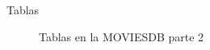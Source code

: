 \documentclass{beamer}%
\begin{document}
\begin{frame}{Tablas}
\begin{figure}
\begin{subfigure}[b]{0.3\textwidth}
    \end{subfigure}
    \caption{Tablas en la MOVIESDB parte 2}
\end{figure}
\end{frame}
\end{document}
